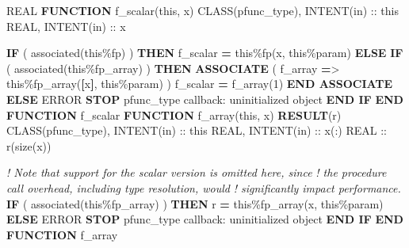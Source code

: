 \documentclass[
]{article}
\newenvironment{Shaded}{}{}
\newcommand{\CommentTok}[1]{\textcolor[rgb]{0.38,0.63,0.69}{\textit{#1}}}
\newcommand{\DataTypeTok}[1]{\textcolor[rgb]{0.56,0.13,0.00}{#1}}
\newcommand{\DecValTok}[1]{\textcolor[rgb]{0.25,0.63,0.44}{#1}}
\newcommand{\FunctionTok}[1]{\textcolor[rgb]{0.02,0.16,0.49}{#1}}
\newcommand{\KeywordTok}[1]{\textcolor[rgb]{0.00,0.44,0.13}{\textbf{#1}}}
\newcommand{\NormalTok}[1]{#1}
\newcommand{\OperatorTok}[1]{\textcolor[rgb]{0.40,0.40,0.40}{#1}}
\newcommand{\StringTok}[1]{\textcolor[rgb]{0.25,0.44,0.63}{#1}}
\begin{document}
\begin{Shaded}
\begin{Highlighting}[]
\DataTypeTok{REAL} \KeywordTok{FUNCTION}\NormalTok{ f\_scalar(this, x)}
   \DataTypeTok{CLASS(pfunc\_type)}\NormalTok{, }\DataTypeTok{INTENT(in)} \DataTypeTok{::}\NormalTok{ this}
   \DataTypeTok{REAL}\NormalTok{, }\DataTypeTok{INTENT(in)} \DataTypeTok{::}\NormalTok{ x}

   \KeywordTok{IF}\NormalTok{ ( }\FunctionTok{associated}\NormalTok{(this}\OperatorTok{\%}\NormalTok{fp) ) }\KeywordTok{THEN}
\NormalTok{      f\_scalar }\KeywordTok{=}\NormalTok{ this}\OperatorTok{\%}\NormalTok{fp(x, this}\OperatorTok{\%}\NormalTok{param)}
   \KeywordTok{ELSE} \KeywordTok{IF}\NormalTok{ ( }\FunctionTok{associated}\NormalTok{(this}\OperatorTok{\%}\NormalTok{fp\_array) ) }\KeywordTok{THEN}
      \KeywordTok{ASSOCIATE}\NormalTok{ ( f\_array }\KeywordTok{=}\OperatorTok{\textgreater{}}\NormalTok{ this}\OperatorTok{\%}\NormalTok{fp\_array(}\KeywordTok{[}\NormalTok{x}\KeywordTok{]}\NormalTok{, this}\OperatorTok{\%}\NormalTok{param) )}
\NormalTok{         f\_scalar }\KeywordTok{=}\NormalTok{ f\_array(}\DecValTok{1}\NormalTok{)}
      \KeywordTok{END ASSOCIATE}
   \KeywordTok{ELSE}
\NormalTok{      ERROR }\KeywordTok{STOP} \StringTok{\textquotesingle{}pfunc\_type callback: uninitialized object\textquotesingle{}}
   \KeywordTok{END IF}
\KeywordTok{END FUNCTION}\NormalTok{ f\_scalar}
\KeywordTok{FUNCTION}\NormalTok{ f\_array(this, x) }\KeywordTok{RESULT}\NormalTok{(r)}
   \DataTypeTok{CLASS(pfunc\_type)}\NormalTok{, }\DataTypeTok{INTENT(in)} \DataTypeTok{::}\NormalTok{ this}
   \DataTypeTok{REAL}\NormalTok{, }\DataTypeTok{INTENT(in)} \DataTypeTok{::}\NormalTok{ x(:)}
   \DataTypeTok{REAL} \DataTypeTok{::}\NormalTok{ r(}\FunctionTok{size}\NormalTok{(x))}

   \CommentTok{! Note that support for the scalar version is omitted here, since}
   \CommentTok{! the procedure call overhead, including type resolution, would}
   \CommentTok{! significantly impact performance.}
   \KeywordTok{IF}\NormalTok{ ( }\FunctionTok{associated}\NormalTok{(this}\OperatorTok{\%}\NormalTok{fp\_array) ) }\KeywordTok{THEN}
\NormalTok{      r }\KeywordTok{=}\NormalTok{ this}\OperatorTok{\%}\NormalTok{fp\_array(x, this}\OperatorTok{\%}\NormalTok{param)}
   \KeywordTok{ELSE}
\NormalTok{      ERROR }\KeywordTok{STOP} \StringTok{\textquotesingle{}pfunc\_type callback: uninitialized object\textquotesingle{}}
   \KeywordTok{END IF}
\KeywordTok{END FUNCTION}\NormalTok{ f\_array}
\end{Highlighting}
\end{Shaded}
\end{document}

